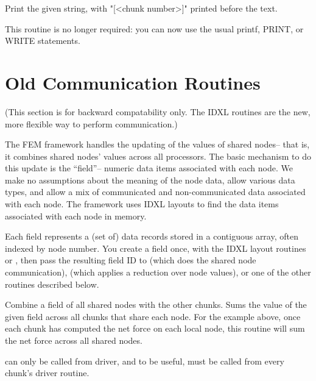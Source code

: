 \documentclass[10pt]{article}
\begin{document}
     Print the given string, with "[<chunk number>]" printed 
     before the text.  

     This routine is no longer required: you can now use 
     the usual printf, PRINT, or WRITE statements.






\section{Old Communication Routines}

(This section is for backward compatability only.  The IDXL routines
are the new, more flexible way to perform communication.)

The FEM framework handles the updating of the values of shared nodes-- that
is, it combines shared nodes' values across all processors.  The basic
mechanism to do this update is the ``field''-- numeric data items associated
with each node. We make no assumptions about the meaning of the node data,
allow various data types, and allow a mix of communicated and non-communicated 
data associated with each node.  The framework uses IDXL layouts to find the data items
associated with each node in memory.

Each field represents a (set of) data records stored in a contiguous array,
often indexed by node number.  You create a field once, with the IDXL layout 
routines or ,
then pass the resulting field ID to  (which does the
shared node communication),  (which applies a
reduction over node values), or one of the other routines described below.



     Combine a field of all shared nodes with the other chunks.  Sums
     the value of the given field across all chunks that share each
     node.  For the example above, once each chunk has computed the net
     force on each local node, this routine will sum the net force
     across all shared nodes.

      can only be called from driver, and to be useful,
     must be called from every chunk's driver routine.
\end{document}
